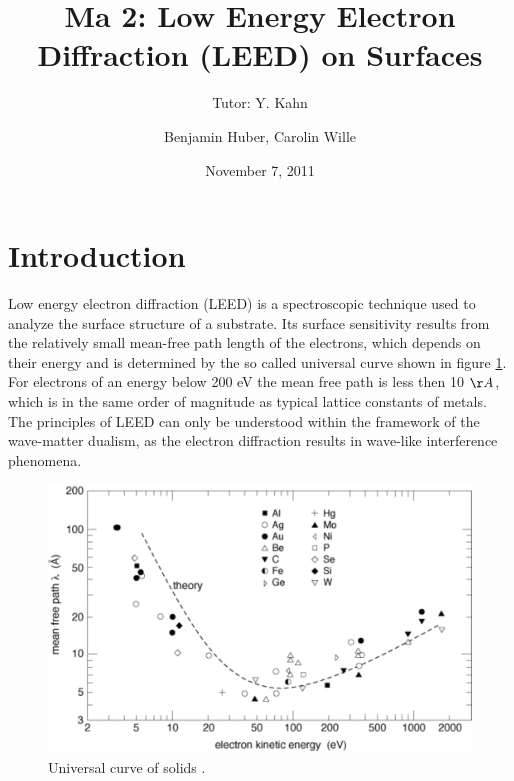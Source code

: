 \documentclass[a4paper]{scrartcl}
\title{Ma 2: Low Energy Electron Diffraction (LEED) on Surfaces}
\subtitle{Tutor: Y. Kahn}
\author{Benjamin Huber, Carolin Wille}
\date{November 7, 2011}
\numberwithin{equation}{section}
\numberwithin{figure}{section}
\numberwithin{table}{section}
\begin{document}
\thispagestyle{empty}
\maketitle
\tableofcontents
\clearpage


\section{Introduction}
Low energy electron diffraction (LEED) is a spectroscopic technique used to analyze the surface structure of a substrate. Its surface sensitivity results from the relatively small mean-free path length of the electrons, which depends on their energy and is determined by the so called universal curve shown in figure \ref{fig:uni}. For electrons of an energy below 200 eV the mean free path is less then 10 $\AA$, which is in the same order of magnitude as typical lattice constants of metals. The principles of LEED can only be understood within the framework of the wave-matter dualism, as the electron diffraction results in wave-like interference phenomena.


\begin{figure}
  \centering
   	\includegraphics[width=0.5\linewidth]{pic/meanfree.pdf}

 \caption{\small Universal curve of solids \cite{zangwill}.  }
        \label{fig:uni}
\end{figure}
\FloatBarrier
\end{document}
